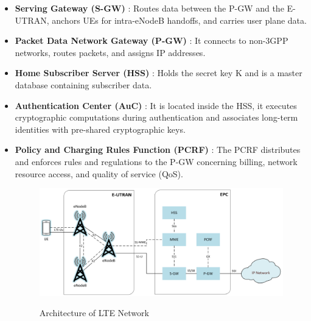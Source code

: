 \documentclass[conference]{IEEEtran}
\begin{document}
\begin{itemize}
\begin{itemize}
        \item \textbf{Serving Gateway (S-GW)} : Routes data between the P-GW and the E-UTRAN, anchors UEs for intra-eNodeB handoffs, and carries user plane data\cite{cichonski2016guide}.

        \item \textbf{Packet Data Network Gateway (P-GW) } : It connects to non-3GPP networks, routes packets, and assigns IP addresses\cite{cichonski2016guide}.

        \item \textbf{Home Subscriber Server (HSS) } : Holds the secret key K and is a master database containing subscriber data\cite{cichonski2016guide}.

        \item \textbf{Authentication Center (AuC) } : It is located inside the HSS, it executes cryptographic computations during authentication and associates long-term identities with pre-shared cryptographic keys\cite{cichonski2016guide}.

        \item \textbf{Policy and Charging Rules Function (PCRF) } : The PCRF distributes and enforces rules and regulations to the P-GW concerning billing, network resource access, and quality of service (QoS)\cite{cichonski2016guide}.

\begin{figure}
            \centering
            \includegraphics[width=0.9\linewidth]{Assets/lte_architecture.png}
            \caption{Architecture of LTE Network} \cite{cichonski2016guide}
            \label{fig:enter-label}
        \end{figure}
    \end{itemize}
    
\end{itemize}
\end{document}

